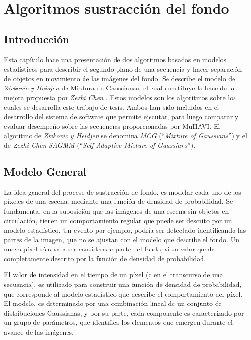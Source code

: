 \chapter{Algoritmos sustracción del fondo}

\section{Introducción}


Esta capítulo hace una presentación de dos algoritmos basados en modelos estadísticos para describir el segundo plano de una secuencia y hacer separación de objetos en movimiento de las imágenes del fondo. Se describe el modelo de \textit{Zivkovic y Heidjen} \cite{zivkovic_efficient_2006} de Mixtura de Gaussianas, el cual constituye la base de la mejora propuesta por \textit{Zezhi Chen} \cite{chen_vehicle_2012}. Estos modelos son los algoritmos sobre los cuales se desarrolla este trabajo de tesis. Ambos han sido incluidos en el desarrollo del sistema de software que permite ejecutar, para luego  comparar y evaluar desempeño sobre las secuencias proporcionadas por MuHAVI. El algoritmo de \textit{Zivkovic y Heidjen} se denomina \textit{MOG} (``\textit{Mixture of Gaussians}'') y el de \textit{Zezhi Chen} \textit{SAGMM} (``\textit{Self-Adaptive Mixture of Gaussians}''). 




\section{Modelo General}

La idea general del proceso de sustracción de fondo, es modelar cada uno de los píxeles de una escena, mediante una función de densidad de probabilidad. Se fundamenta, en la suposición que las imágenes de una escena sin objetos en circulación, tienen un comportamiento regular que puede ser descrito por un modelo estadístico. Un evento por ejemplo, podría ser detectado identificando las partes de la imagen, que no se ajustan con el modelo que describe el fondo. Un nuevo píxel sólo va a ser considerado parte del fondo, si su valor queda completamente descrito por la función de densidad de probabilidad. 


El valor de intensidad en el tiempo de un píxel (o en el transcurso de una secuencia), es utilizado para construir una función de densidad de probabilidad, que corresponde al modelo estadístico que describe el comportamiento del píxel. El modelo, es determinado por una combinación lineal de un conjunto de distribuciones Gaussianas, y por su parte, cada componente es caracterizado por un grupo de parámetros, que identifica los elementos que emergen durante el avance de las imágenes.


